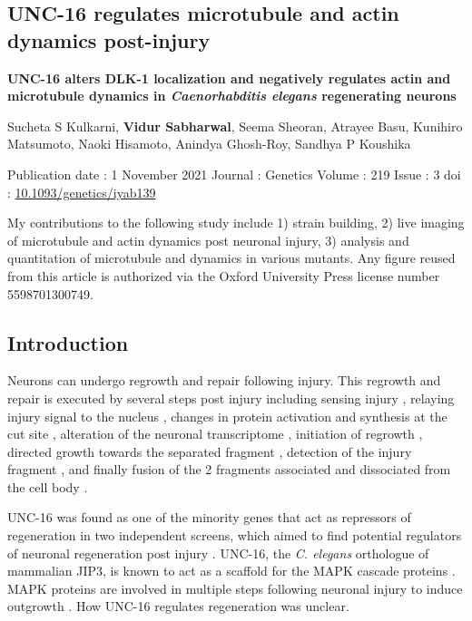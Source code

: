 \begin{appendices}
	\chapter{UNC-16 regulates microtubule and actin dynamics post-injury}
	
	
	\large \textbf{UNC-16 alters DLK-1 localization and negatively regulates actin and microtubule dynamics in \textit{Caenorhabditis elegans} regenerating neurons}
	
	\small
	Sucheta S Kulkarni, \textbf{Vidur Sabharwal}, Seema Sheoran, Atrayee Basu, Kunihiro Matsumoto, Naoki Hisamoto, Anindya Ghosh-Roy, Sandhya P Koushika
	
	Publication date : 1 November 2021
	Journal : Genetics
	Volume : 219
	Issue : 3
	doi : \href{https://doi.org/10.1093/genetics/iyab139}{10.1093/genetics/iyab139}
	
	\normalsize
	My contributions to the following study include 
	1) strain building, 
	2) live imaging of microtubule and actin dynamics post neuronal injury, 
	3) analysis and quantitation of microtubule and dynamics in various mutants.
	Any figure reused from this article is authorized via the Oxford University Press license number 5598701300749.
	
	\pagebreak
	\section{Introduction} 
	
	Neurons can undergo regrowth and repair following injury. This regrowth and repair is executed by several steps post injury including sensing injury \parencite{hammarlund2009}, relaying injury signal to the nucleus \parencite{sung2001}, changes in protein activation and synthesis at the cut site \parencite{yan2009, ghosh-roy2012}, alteration of the neuronal transcriptome \parencite{jin2022}, initiation of regrowth \parencite{barnat2010}, directed growth towards the separated fragment \parencite{chisholm2016}, detection of the injury fragment \parencite{abay2017}, and finally fusion of the 2 fragments associated and dissociated from the cell body \parencite{neumann2015}.
	
	UNC-16 was found as one of the minority genes that act as repressors of regeneration in two independent screens, which aimed to find potential regulators of neuronal regeneration post injury \parencite{chen2011, nix2014}. UNC-16, the \textit{C. elegans}  orthologue of mammalian JIP3, is known to act as a scaffold for the MAPK cascade proteins \parencite{kelkar2000, senguptaghosh2011}. MAPK proteins are involved in multiple steps following neuronal injury to induce outgrowth \parencite{barnat2010, hammarlund2009, sung2001, yan2009}. How UNC-16 regulates regeneration was unclear.
	

\end{appendices}
